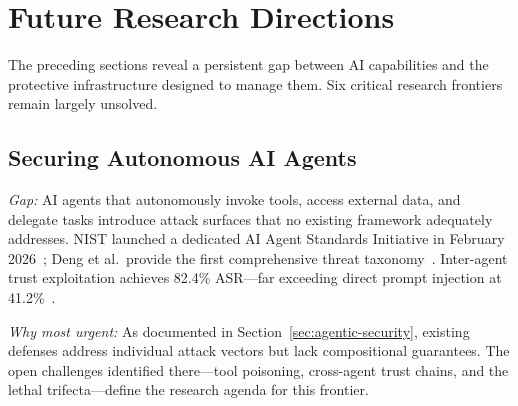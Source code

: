 
\section{Future Research Directions}
\label{sec:future}

The preceding sections reveal a persistent gap between AI capabilities and the protective infrastructure designed to manage them. Six critical research frontiers remain largely unsolved.


\subsection{Securing Autonomous AI Agents}
\label{sec:future-agents}


\emph{Gap:} AI agents that autonomously invoke tools, access external data, and delegate tasks introduce attack surfaces that no existing framework adequately addresses. NIST launched a dedicated AI Agent Standards Initiative in February 2026~\cite{nist2026agentstandards}; Deng et al.\ provide the first comprehensive threat taxonomy~\cite{deng2025agentthreat}. Inter-agent trust exploitation achieves 82.4\% ASR---far exceeding direct prompt injection at 41.2\%~\cite{darkside2025agents}.

\emph{Why most urgent:} As documented in Section~\ref{sec:agentic-security}, existing defenses address individual attack vectors but lack compositional guarantees. The open challenges identified there---tool poisoning, cross-agent trust chains, and the lethal trifecta---define the research agenda for this frontier.

